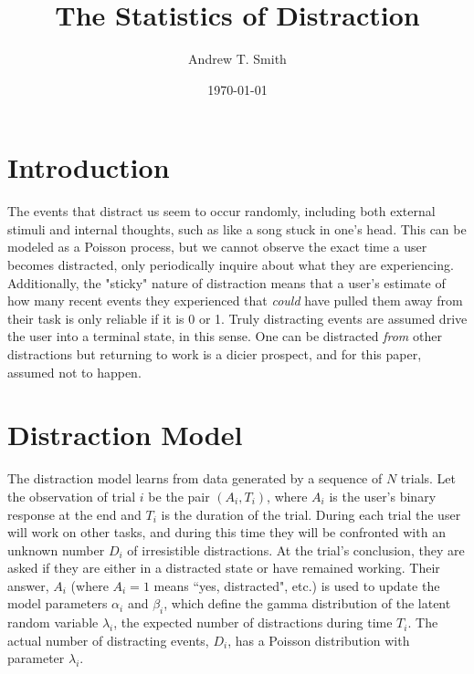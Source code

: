 \documentclass{article}
\begin{document}
\title{The Statistics of Distraction}
\author{Andrew T. Smith}
\date{\today}
\maketitle

\section{Introduction}
The events that distract us seem to occur randomly, including both external stimuli and internal thoughts, such as like a song stuck in one's head.   This can be modeled as a Poisson process, but we cannot observe the exact time a user becomes distracted, only periodically inquire about what they are experiencing.  Additionally, the "sticky" nature of distraction means that a user's estimate of how many recent events they experienced that \emph{could} have pulled them away from their task is only reliable if it is 0 or 1.  Truly distracting events are assumed drive the user into a terminal state, in this sense. One can be distracted \emph{from} other distractions but returning to work is a dicier prospect, and for this paper, assumed not to happen.

\section{Distraction Model}
The distraction model learns from data generated by a sequence of $N$ trials.  Let the observation of trial $i$ be the pair $(A_i, T_i)$, where $A_i$ is the user's binary response at the end and $T_i$ is the duration of the trial.  During each trial the user will work on other tasks, and during this time they will be confronted with an unknown number $D_i$ of irresistible distractions.  At the trial's conclusion, they are asked if they are either in a distracted state or have remained working.  Their answer, $A_i$ (where $A_i=1$ means ``yes, distracted", etc.) is used to update the model parameters $\alpha_i$ and $\beta_i$, which define the gamma distribution of the latent random variable  $\lambda_i$, the expected number of distractions during time $T_i$.  The actual number of distracting events, $D_i$, has a Poisson distribution with parameter $\lambda_i$.
\bigskip
\newcommand{\poisson}{{\rm Pr}}
\newcommand{\exponential}{{\rm Exp}}


\newcolumntype{b}{X}
\end{document}
